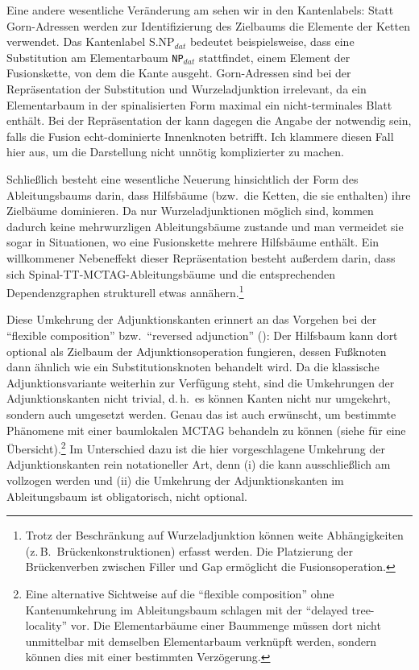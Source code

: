 Eine andere wesentliche Veränderung am  sehen wir in den Kantenlabels: Statt Gorn-Adressen werden zur Identifizierung des Zielbaums die Elemente der Ketten verwendet. Das Kantenlabel {\sc S.NP$_{dat}$} bedeutet beispielsweise, dass eine Substitution am Elementarbaum {\tt NP$_{dat}$} stattfindet, einem Element der Fusionskette, von dem die Kante ausgeht. Gorn-Adressen sind bei der Repräsentation der Substitution und Wurzeladjunktion irrelevant, da ein Elementarbaum in der spinalisierten Form maximal ein nicht-terminales Blatt enthält. Bei der Repräsentation der  kann dagegen die Angabe der  notwendig sein, falls die Fusion echt-dominierte Innenknoten betrifft. Ich klammere diesen Fall hier aus, um die Darstellung nicht unnötig komplizierter zu machen.

Schlie\ss lich besteht eine wesentliche Neuerung hinsichtlich der Form des Ableitungsbaums darin, dass Hilfsbäume (bzw.\ die Ketten, die sie enthalten) ihre Zielbäume dominieren. Da nur Wurzeladjunktionen möglich sind, kommen dadurch keine mehrwurzligen Ableitungsbäume zustande und man vermeidet sie sogar in Situationen, wo eine Fusionskette mehrere Hilfsbäume enthält. Ein willkommener Nebeneffekt dieser Repräsentation besteht au\ss erdem darin, dass sich Spinal-TT-MCTAG-Ableitungsbäume und die entsprechenden Dependenzgraphen strukturell etwas annähern.\footnote{Trotz der Beschränkung auf Wurzeladjunktion können weite Abhängigkeiten (z.\,B.\ Brückenkonstruktionen) erfasst werden. Die Platzierung der Brückenverben zwischen Filler und Gap ermöglicht die Fusionsoperation.}

Diese Umkehrung der Adjunktionskanten erinnert an das Vorgehen bei der "`flexible composition"' bzw.\ "`reversed adjunction"' (\citealt{Joshi:etal:03, Kallmeyer:Joshi:03, Chiang:Scheffler:08}): Der Hilfsbaum kann dort optional als Zielbaum der Adjunktionsoperation fungieren, dessen Fu\ss knoten dann ähnlich wie ein Substitutionsknoten behandelt wird. Da die klassische Adjunktionsvariante weiterhin zur Verfügung steht, sind die Umkehrungen der Adjunktionskanten nicht trivial, d.\,h.\ es können Kanten nicht nur umgekehrt, sondern auch umgesetzt werden. Genau das ist auch erwünscht, um bestimmte Phänomene mit einer baumlokalen MCTAG behandeln zu können (siehe \cite{Chiang:Scheffler:08} für eine Übersicht).\footnote{Eine alternative Sichtweise auf die "`flexible composition"' ohne Kantenumkehrung im Ableitungsbaum schlagen \cite{Chiang:Scheffler:08} mit der "`delayed tree-locality"' vor. Die Elementarbäume einer Baummenge müssen dort nicht unmittelbar mit demselben Elementarbaum verknüpft werden, sondern können dies mit einer bestimmten Verzögerung.} Im Unterschied dazu ist die hier vorgeschlagene Umkehrung der Adjunktionskanten rein notationeller Art, denn (i) die  kann ausschlie\ss lich am  vollzogen werden und (ii) die Umkehrung der Adjunktionskanten im Ableitungsbaum ist obligatorisch, nicht optional.     \\ 

